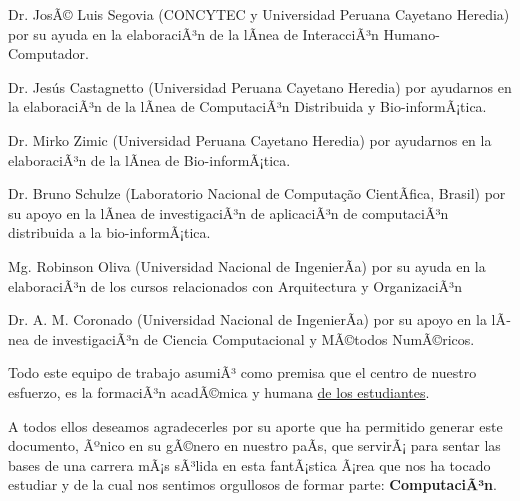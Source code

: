 \begin{itemize}
{\item Dr. JosÃ© Luis Segovia (CONCYTEC y Universidad Peruana Cayetano Heredia) por su ayuda en la elaboraciÃ³n de la lÃ­nea de InteracciÃ³n Humano-Computador.

\item Dr. Jes\'us Castagnetto (Universidad Peruana Cayetano Heredia) por ayudarnos en la elaboraciÃ³n de la lÃ­nea de ComputaciÃ³n Distribuida y Bio-informÃ¡tica.

\item Dr. Mirko Zimic (Universidad Peruana Cayetano Heredia) por ayudarnos en la elaboraciÃ³n de la lÃ­nea de Bio-informÃ¡tica.

\item Dr. Bruno Schulze (Laboratorio Nacional de Computa\c{c}\~ao CientÃ­fica, Brasil) por su apoyo en la lÃ­nea de investigaciÃ³n de aplicaciÃ³n de computaciÃ³n distribuida a la bio-informÃ¡tica.

\item Mg. Robinson Oliva (Universidad Nacional de IngenierÃ­a) por su ayuda en la elaboraciÃ³n de los cursos relacionados con Arquitectura y OrganizaciÃ³n

\item Dr. A. M. Coronado (Universidad Nacional de IngenierÃ­a) por su apoyo en la lÃ­nea de investigaciÃ³n de Ciencia Computacional y MÃ©todos NumÃ©ricos.
}
\end{itemize}



Todo este equipo de trabajo asumiÃ³ como premisa que el centro de nuestro esfuerzo, 
es la formaciÃ³n acadÃ©mica y humana \underline{de los estudiantes}.

A todos ellos deseamos agradecerles por su aporte que ha permitido generar 
este documento, Ãºnico en su gÃ©nero en nuestro paÃ­s, que servirÃ¡ para sentar las 
bases de una carrera mÃ¡s sÃ³lida en esta fantÃ¡stica Ã¡rea que nos ha tocado estudiar y 
de la cual nos sentimos orgullosos de formar parte: \textbf{ComputaciÃ³n}.
